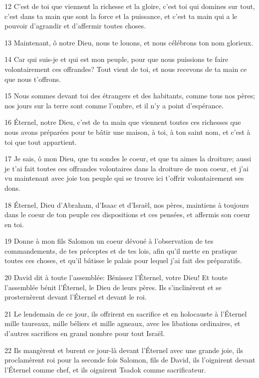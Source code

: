 \par 12 C'est de toi que viennent la richesse et la gloire, c'est toi qui domines sur tout, c'est dans ta main que sont la force et la puissance, et c'est ta main qui a le pouvoir d'agrandir et d'affermir toutes choses.
\par 13 Maintenant, ô notre Dieu, nous te louons, et nous célébrons ton nom glorieux.
\par 14 Car qui suis-je et qui est mon peuple, pour que nous puissions te faire volontairement ces offrandes? Tout vient de toi, et nous recevons de ta main ce que nous t'offrons.
\par 15 Nous sommes devant toi des étrangers et des habitants, comme tous nos pères; nos jours sur la terre sont comme l'ombre, et il n'y a point d'espérance.
\par 16 Éternel, notre Dieu, c'est de ta main que viennent toutes ces richesses que nous avons préparées pour te bâtir une maison, à toi, à ton saint nom, et c'est à toi que tout appartient.
\par 17 Je sais, ô mon Dieu, que tu sondes le coeur, et que tu aimes la droiture; aussi je t'ai fait toutes ces offrandes volontaires dans la droiture de mon coeur, et j'ai vu maintenant avec joie ton peuple qui se trouve ici t'offrir volontairement ses dons.
\par 18 Éternel, Dieu d'Abraham, d'Isaac et d'Israël, nos pères, maintiens à toujours dans le coeur de ton peuple ces dispositions et ces pensées, et affermis son coeur en toi.
\par 19 Donne à mon fils Salomon un coeur dévoué à l'observation de tes commandements, de tes préceptes et de tes lois, afin qu'il mette en pratique toutes ces choses, et qu'il bâtisse le palais pour lequel j'ai fait des préparatifs.
\par 20 David dit à toute l'assemblée: Bénissez l'Éternel, votre Dieu! Et toute l'assemblée bénit l'Éternel, le Dieu de leurs pères. Ils s'inclinèrent et se prosternèrent devant l'Éternel et devant le roi.
\par 21 Le lendemain de ce jour, ils offrirent en sacrifice et en holocauste à l'Éternel mille taureaux, mille béliers et mille agneaux, avec les libations ordinaires, et d'autres sacrifices en grand nombre pour tout Israël.
\par 22 Ils mangèrent et burent ce jour-là devant l'Éternel avec une grande joie, ils proclamèrent roi pour la seconde fois Salomon, fils de David, ils l'oignirent devant l'Éternel comme chef, et ils oignirent Tsadok comme sacrificateur.
